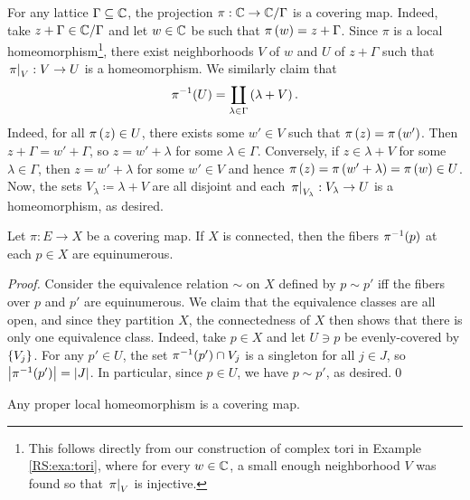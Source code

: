 \documentclass[../Moduli_Spaces_of_Riemann_Surfaces.tex]{subfiles}
\begin{document}
    \begin{example}\label{CS:exa:torus_covering_map}
        For any lattice $\Gamma\subseteq\mathbb{C}$, the projection $\pi:\mathbb{C}\to\mathbb{C}/\Gamma$ is a covering map. Indeed, take $z+\Gamma\in\mathbb{C}/\Gamma$ and let $w\in\mathbb{C}$ be such that $\pi\left(w\right)=z+\Gamma$. Since $\pi$ is a local homeomorphism\footnote{This follows directly from our construction of complex tori in Example \ref{RS:exa:tori}, where for every $w\in\mathbb{C}$, a small enough neighborhood $V$ was found so that $\left.\pi\right|_V$ is injective.}, there exist neighborhoods $V$ of $w$ and $U$ of $z+\Gamma$ such that $\left.\pi\right|_{V}:V\to U$ is a homeomorphism. We similarly claim that
        \begin{equation*}
            \pi^{-1}\!\left(U\right)=\coprod_{\lambda\in\Gamma}\left(\lambda+V\right).
        \end{equation*}
        Indeed, for all $\pi\left(z\right)\in U$, there exists some $w'\in V$ such that $\pi\left(z\right)=\pi\left(w'\right)$. Then $z+\Gamma=w'+\Gamma$, so $z=w'+\lambda$ for some $\lambda\in\Gamma$. Conversely, if $z\in\lambda+V$ for some $\lambda\in\Gamma$, then $z=w'+\lambda$ for some $w'\in V$ and hence $\pi\left(z\right)=\pi\left(w'+\lambda\right)=\pi\left(w\right)\in U$. Now, the sets $V_\lambda\coloneqq\lambda+V$ are all disjoint and each $\left.\pi\right|_{V_\lambda}:V_\lambda\to U$ is a homeomorphism, as desired.\exqed
    \end{example}
    \begin{proposition}\label{CS:prp:fiber_cardinalities_coincide}
        Let $\pi:E\to X$ be a covering map. If $X$ is connected, then the fibers $\pi^{-1}\!\left(p\right)$ at each $p\in X$ are equinumerous.
    \end{proposition}
    \begin{proof}
        Consider the equivalence relation $\sim$ on $X$ defined by $p\sim p'$ iff the fibers over $p$ and $p'$ are equinumerous. We claim that the equivalence classes are all open, and since they partition $X$, the connectedness of $X$ then shows that there is only one equivalence class. Indeed, take $p\in X$ and let $U\ni p$ be evenly-covered by $\left\{V_j\right\}$. For any $p'\in U$, the set $\pi^{-1}\!\left(p'\right)\cap V_j$ is a singleton for all $j\in J$, so $\left|\pi^{-1}\!\left(p'\right)\right|=\left|J\right|$. In particular, since $p\in U$, we have $p\sim p'$, as desired.\qed
    \end{proof}
    \begin{proposition}\label{CS:prp:proper_local_covering}
        Any proper local homeomorphism is a covering map.
    \end{proposition}
\end{document}
